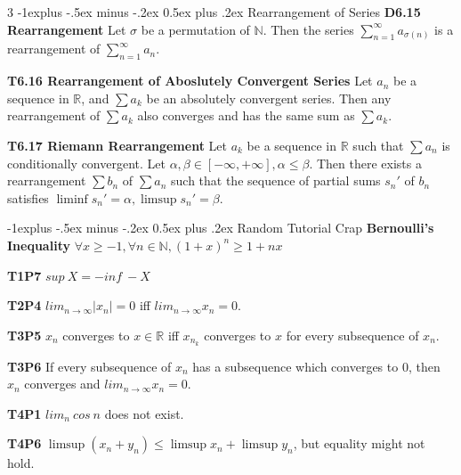 \documentclass[10pt, landscape]{article}
\makeatletter
\renewcommand{\section}{\@startsection{section}{1}{0mm}%
                                {-1ex plus -.5ex minus -.2ex}%
                                {0.5ex plus .2ex}%
                                {\normalfont\large\bfseries}}
\renewcommand{\section}{\@startsection{section}{2}{0mm}%
                                {-1explus -.5ex minus -.2ex}%
                                {0.5ex plus .2ex}%
                                {\normalfont\normalsize\bfseries}}
\makeatother
\begin{document}
\begin{multicols*}{3}
\section{Rearrangement of Series}
\textbf{D6.15 Rearrangement} Let $\sigma$ be a permutation of $\mathbb{N}$. Then the series $\sum_{n=1}^\infty a_{\sigma(n)}$ is a rearrangement of $\sum_{n=1}^\infty a _n$.

\textbf{T6.16 Rearrangement of Aboslutely Convergent Series} Let $a_n$ be a sequence in $\mathbb{R}$, and $\sum a_k$ be an absolutely convergent series. Then any rearrangement of $\sum a_k$ also converges and has the same sum as $\sum a_k$.

\textbf{T6.17 Riemann Rearrangement} Let $a_k$ be a sequence in $\mathbb{R}$ such that $\sum a_n$ is conditionally convergent. Let $\alpha, \beta \in [-\infty, +\infty], \alpha \leq \beta$. Then there exists a rearrangement $\sum b_n$ of $\sum a_n$ such that the sequence of partial sums $s_n'$ of $b_n$ satisfies $\liminf s_n'=\alpha, \limsup s_n'=\beta$.

\section{Random Tutorial Crap}
\textbf{Bernoulli's Inequality} $\forall x \geq -1, \forall n \in \mathbb{N}, (1+x)^n \geq 1+nx$

\textbf{T1P7} $sup\ X = - inf\ -X$

\textbf{T2P4} $lim_{n\rightarrow\infty}|x_n|=0$ iff $lim_{n \rightarrow\infty}x_n=0$.

\textbf{T3P5} $x_n$ converges to $x \in \mathbb{R}$ iff $x_{n_k}$ converges to $x$ for every subsequence of $x_n$.

\textbf{T3P6} If every subsequence of $x_n$ has a subsequence which converges to $0$, then $x_n$ converges and $lim_{n\rightarrow\infty}x_n=0$.

\textbf{T4P1} $lim_n\ cos\ n$ does not exist.

\textbf{T4P6} $\limsup (x_n+y_n) \leq \limsup x_n + \limsup y_n$, but equality might not hold.

\end{multicols*}
\end{document}

